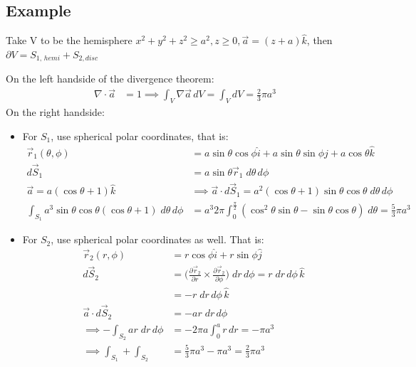 \documentclass[a4paper, 11pt, normalem]{report}
\newcommand\p{\partial}
\begin{document}
\subsection{Example}
Take V to be the hemisphere $x^2 + y^2 + z^2 \geq a^2, z \geq 0, \vec{a} = (z + a)\hat{k}$, then $\p V = S_{1,\,hemi} + S_{2, disc}$

On the left handside of the divergence theorem:
\begin{align*}
    \nabla \cdot \vec{a} &= 1 \implies \int_V \nabla \vec{a}\,dV = \int_V dV = \frac{2}{3}\pi a^3
\end{align*}
On the right handside:
\begin{itemize}
    \item For $S_1$, use spherical polar coordinates, that is:
            \begin{align*}
                \vec{r}_1(\theta,\phi) &= a\sin\theta\cos\phi \hat{i} + a\sin\theta\sin\phi \hat{j} + a\cos\theta \hat{k} \\
                d\vec{S}_1 &= a\sin\theta \vec{r}_1 \;d\theta\, d\phi \\
                \vec{a} = a(\cos\theta + 1)\hat{k} &\implies \vec{a} \cdot d\vec{S}_1 = a^2(\cos\theta + 1)\sin\theta\cos\theta\;d\theta\,d\phi \\
                \int_{S_1} a^3 \sin\theta\cos\theta(\cos\theta + 1)\;d\theta\,d\phi &= a^3 2\pi \int_0^{\frac{\pi}{2}} (\cos^2 \theta \sin\theta - \sin\theta\cos\theta)\;d\theta = \frac{5}{3}\pi a^3
            \end{align*}
        \item For $S_2$, use spherical polar coordinates as well. That is:
                \begin{align*}
                    \vec{r}_2(r, \phi) &= r\cos\phi \hat{i} + r\sin\phi \hat{j} \\
                    d\vec{S}_2 &= \Big(\frac{\p \vec{r}_2}{\p r} \times \frac{\p \vec{r}_2}{\p \phi}\Big)\;dr\,d\phi = r\;dr\,d\phi \,\hat{k} \\
                    &= -r\;dr\,d\phi \,\hat{k} \\
                    \vec{a} \cdot d\vec{S}_2 &= -ar\;dr\,d\phi \\
                    \implies -\int_{S_2} ar\;dr\,d\phi &= -2\pi a \int_0^a r\,dr = -\pi a^3 \\
                    \implies \int_{S_1} + \int_{S_2} &= \frac{5}{3}\pi a^3 - \pi a^3 = \frac{2}{3} \pi a^3
                \end{align*}
\end{itemize}
\end{document}
